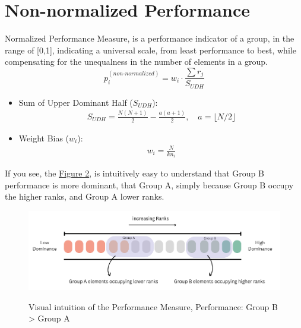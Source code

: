 \documentclass[a4paper,fleqn,review]{cas-sc}
\begin{document}
\section{Non-normalized Performance}

\begin{nonNormalizedPerformanceMeasure}
	Normalized Performance Measure, is a performance indicator of a group, in the range of [0,1], indicating a universal scale, from least performance to best, while compensating for the unequalness in the number of elements in a group.
	\begin{equation}
		\label{eq:non-normalized}
		p_i^{(non\text{-}normalized)} = w_i \cdot \frac{\sum r_j}{ S_{UDH} }
	\end{equation}
	
	\begin{itemize}
		\item Sum of Upper Dominant Half ($S_{UDH}$):
		\begin{align}
			S_{UDH} = \frac{N(N+1)}{2} - \frac{a(a+1)}{2}, \quad a = \lfloor N/2 \rfloor
		\end{align}
		\item Weight Bias ($w_i$):
		\begin{align}
			w_i = \frac{N}{k n_i}
		\end{align}
	\end{itemize}
	
\end{nonNormalizedPerformanceMeasure}

If you see, the \hyperref[fig:dominance_Understanding]{Figure 2}, is intuitively easy to understand that Group B performance is more dominant, that Group A, simply because Group B occupy the higher ranks, and Group A lower ranks.
\begin{figure}
    \caption{Visual intuition of the Performance Measure, Performance: Group B > Group A}
    \centering
    \includegraphics[scale=0.65]{dominance-intuition.png}
    \label{fig:dominance_Understanding}
\end{figure}
\end{document}
